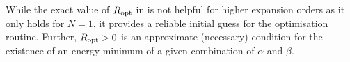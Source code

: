 While the exact value of $R_{\rm opt}$ in  is not helpful for higher expansion orders as it only holds for $N = 1$, it provides a reliable initial guess for the optimisation routine.
Further, $R_{\rm opt} > 0$ is an approximate (necessary) condition for the existence of an energy minimum of a given combination of $\alpha$ and $\beta$.
